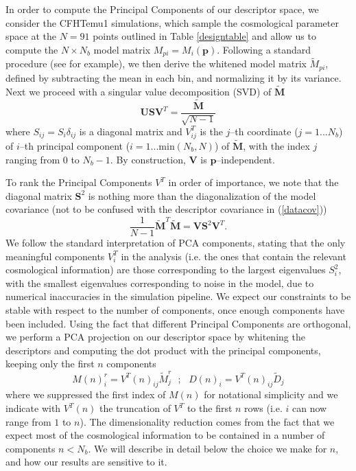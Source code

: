 \documentclass[reprint,aps,prd,superscriptaddress,showkeys,showpacs]{revtex4-1}
\begin{document}
In order to compute the Principal Components of our descriptor space, we consider the CFHTemu1 simulations, which sample the cosmological parameter space at the $N=91$ points outlined in Table \ref{designtable} and allow us to compute the $N\times N_b$ model matrix $M_{pi}=M_i(\mathbf{p})$. Following a standard procedure (see \citep{astroMLText} for example), we then derive the whitened model matrix $\tilde{M}_{pi}$, defined by subtracting the mean in each bin, and normalizing it by its variance. Next we proceed with a singular value decomposition (SVD) of $\mathbf{\tilde{M}}$
\begin{equation}
\label{svd}
\mathbf{U}\mathbf{S} \mathbf{V}^T=\frac{\mathbf{\tilde{M}}}{\sqrt{N-1}}
\end{equation}   
%
where $S_{ij}=S_i\delta_{ij}$ is a diagonal matrix and $V^T_{ij}$ is the $j$--th coordinate ($j=1...N_b$) of $i$--th principal component ($i=1...\mathrm{min}(N_b,N)$) of $\mathbf{\tilde{M}}$, with the index $j$ ranging from $0$ to $N_b-1$. By construction, $\mathbf{V}$ is $\mathbf{p}$--independent.

To rank the Principal Components $V^T$ in order of importance, we note that the diagonal matrix $\mathbf{S}^2$ is nothing more than the diagonalization of the model covariance (not to be confused with the descriptor covariance in (\ref{datacov}))
\begin{equation}
\frac{1}{N-1}\mathbf{\tilde{M}}^T\mathbf{\tilde{M}} = \mathbf{V}\mathbf{S}^2\mathbf{V}^T.
\end{equation} 
%
We follow the standard interpretation of PCA components, stating that the only meaningful components $V^T_i$ in the analysis (i.e. the ones that contain the relevant cosmological information) are those corresponding to the largest eigenvalues $S^2_{i}$, with the smallest eigenvalues corresponding to noise in the model, due to numerical inaccuracies in the simulation pipeline. We expect our constraints to be stable with respect to the number of components, once enough components have been included. Using the fact that different Principal Components are orthogonal, we perform a PCA projection on our descriptor space by whitening the descriptors and computing the dot product with the principal components, keeping only the first $n$ components
\begin{equation}
\label{pcaprojection}
M(n)_{i}^r = V^T(n)_{ij}\tilde{M}_j^r \,\,\,\, ; \,\,\,\,  D(n)_i = V^T(n)_{ij}\tilde{D}_j
\end{equation}
%
where we suppressed the first index of $M(n)$ for notational simplicity and we indicate with $V^T(n)$ the truncation of $V^T$ to the first $n$ rows (i.e. $i$ can now range from $1$ to $n$). The dimensionality reduction comes from the fact that we expect most of the cosmological information to be contained in a number of components $n<N_{b}$. We will describe in detail below the choice we make for $n$, and how our results are sensitive to it.
\end{document}
